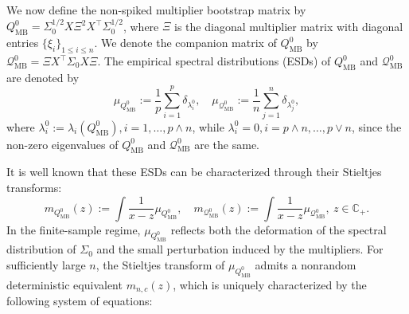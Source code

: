 \documentclass[12pt]{article}
\theoremstyle{plain}
\numberwithin{equation}{section}
\begin{document}
We now define the non-spiked multiplier bootstrap matrix by $Q_{\mathrm{MB}}^0=\Sigma_0^{1/2}X\Xi^2X^{\top}\Sigma_0^{1/2}$, where $\Xi$ is the diagonal multiplier matrix with diagonal entries $\{\xi_i\}_{1\le i\le n}$. We denote the companion matrix of $Q_{\mathrm{MB}}^0$ by $\mathcal{Q}_{\mathrm{MB}}^0=\Xi X^{\top}\Sigma_0 X\Xi$. The empirical spectral distributions (ESDs) of $Q_{\mathrm{MB}}^0$ and $\mathcal{Q}_{\mathrm{MB}}^0$ are denoted by
\begin{equation}\label{eq_esd}
	\mu_{Q_{\mathrm{MB}}^0}:=\frac{1}{p}\sum_{i=1}^p \delta_{\lambda^0_i},\quad \mu_{\mathcal{Q}_{\mathrm{MB}}^0}:=\frac{1}{n}\sum_{j=1}^n \delta_{\lambda^0_j},
\end{equation}
where $\lambda_i^0:=\lambda_i(Q_{\mathrm{MB}}^0), i=1,\dots, p\wedge n$, while $\lambda_i^0=0,i=p\wedge n,\dots, p\vee n$, since the non-zero eigenvalues of $Q_{\mathrm{MB}}^0$ and $\mathcal{Q}_{\mathrm{MB}}^0$ are the same.

It is well known that these ESDs can be characterized through their Stieltjes transforms:
\begin{equation}\label{eq_mq}
	m_{Q_{\mathrm{MB}}^0}(z):=\int\frac{1}{x-z}\mu_{Q_{\mathrm{MB}}^0},\quad m_{\mathcal{Q}_{\mathrm{MB}}^0}(z):=\int\frac{1}{x-z}\mu_{\mathcal{Q}_{\mathrm{MB}}^0}, \ z \in \mathbb{C}_+.
\end{equation}
In the finite-sample regime, $\mu_{Q_{\mathrm{MB}}^0}$ reflects both the deformation of the spectral distribution of $\Sigma_0$ and the small perturbation induced by the multipliers. For sufficiently large $n$, the Stieltjes transform of $\mu_{Q_{\mathrm{MB}}^0}$ admits a nonrandom deterministic equivalent $m_{n,c}(z)$, which is uniquely characterized by the following system of equations:
\end{document}
